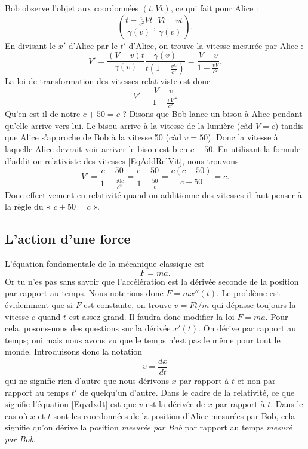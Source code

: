 Bob observe l'objet aux coordonnées $(t,Vt)$, ce qui fait pour Alice :
\[
  \left( \frac{ t-\frac{ v }{ c^2 }Vt }{ \gamma(v) },\frac{ Vt-vt }{ \gamma(v) } \right).
\]
En divisant le $x'$ d'Alice par le $t'$ d'Alice, on trouve la vitesse mesurée par Alice :
\[
  V'=\frac{ (V-v)t }{ \gamma(v) }\frac{ \gamma(v) }{ t\left( 1-\frac{ vV }{ c^2 } \right) }=\frac{ V-v }{ 1-\frac{ vV }{ c^2 } }.
\]
La loi de transformation des vitesses relativiste est donc
\begin{equation}	\label{EqAddRelVit}
V'=\frac{ V-v }{ 1-\frac{ vV }{ c^2 } }.
\end{equation}
Qu'en est-il de notre $c+50=c$ ? Disons que Bob lance un bisou à Alice pendant qu'elle arrive vers lui. Le bisou arrive à la vitesse de la lumière (càd $V=c$) tandis que Alice s'approche de Bob à la vitesse \unit{50}{\meter\per\second} (càd $v=50$). Donc la vitesse à laquelle Alice devrait voir arriver le bisou est bien $c+50$. En utilisant la formule d'addition relativiste des vitesses \eqref{EqAddRelVit}, nous trouvons
\[
  V'=\frac{ c-50 }{ 1-\frac{ 50c }{ c^2 } }=\frac{ c-50 }{ 1-\frac{ 50 }{ c } }=\frac{ c(c-50) }{ c-50 }=c.
\]
Donc effectivement en relativité quand on additionne des vitesses il faut penser à la règle du « $c+50=c$ ».

\subsection{L'action d'une force}

L'équation fondamentale de la mécanique classique est
\[
  F=ma.
\]
Or tu n'es pas sans savoir que l'accélération est la dérivée seconde de la position par rapport au temps. Nous noterions donc $F=mx''(t)$. Le problème est évidemment que si $F$ est constante, on trouve $v=Ft/m$ qui dépasse toujours la vitesse $c$ quand $t$ est assez grand. Il faudra donc modifier la loi $F=ma$. Pour cela, posons-nous des questions sur la dérivée $x'(t)$. On dérive par rapport au temps; oui mais nous avons vu que le temps n'est pas le même pour tout le monde. Introduisons donc la notation
\begin{equation}	\label{Eqvdxdt}
  v=\frac{ dx }{ dt }
\end{equation}
qui ne signifie rien d'autre que nous dérivons $x$ par rapport à $t$ et non par rapport au temps $t'$ de quelqu'un d'autre. Dans le cadre de la relativité, ce que signifie l'équation \eqref{Eqvdxdt} est que $v$ est la dérivée de $x$ par rapport à $t$. Dans le cas où $x$ et $t$ sont les coordonnées de la position d'Alice mesurées par Bob, cela signifie qu'on dérive la position \emph{mesurée par Bob} par rapport au temps \emph{mesuré par Bob}.

